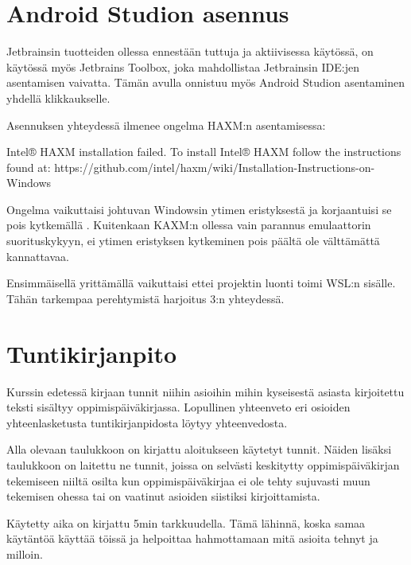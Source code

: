 \section{Android Studion asennus}

Jetbrainsin tuotteiden ollessa ennestään tuttuja ja aktiivisessa käytössä, on
käytössä myös Jetbrains Toolbox, joka mahdollistaa Jetbrainsin IDE:jen
asentamisen vaivatta. Tämän avulla onnistuu myös Android Studion asentaminen
yhdellä klikkaukselle.

Asennuksen yhteydessä ilmenee ongelma HAXM:n asentamisessa:

\begin{displayquote}
Intel® HAXM installation failed. To install Intel® HAXM follow the instructions found at: https://github.com/intel/haxm/wiki/Installation-Instructions-on-Windows
\end{displayquote}

Ongelma vaikuttaisi johtuvan Windowsin ytimen eristyksestä ja korjaantuisi se
pois kytkemällä \parencite{GithubIntelHaxmIssue412}. Kuitenkaan KAXM:n ollessa
vain parannus emulaattorin suorituskykyyn, ei ytimen eristyksen kytkeminen pois
päältä ole välttämättä kannattavaa.

Ensimmäisellä yrittämällä vaikuttaisi ettei projektin luonti toimi WSL:n
sisälle. Tähän tarkempaa perehtymistä harjoitus 3:n yhteydessä.

\section{Tuntikirjanpito}

Kurssin edetessä kirjaan tunnit niihin asioihin mihin kyseisestä asiasta
kirjoitettu teksti sisältyy oppimispäiväkirjassa. Lopullinen yhteenveto eri
osioiden yhteenlasketusta tuntikirjanpidosta löytyy yhteenvedosta.

Alla olevaan taulukkoon on kirjattu aloitukseen käytetyt tunnit. Näiden lisäksi
taulukkoon on laitettu ne tunnit, joissa on selvästi keskitytty
oppimispäiväkirjan tekemiseen niiltä osilta kun oppimispäiväkirjaa ei ole tehty
sujuvasti muun tekemisen ohessa tai on vaatinut asioiden siistiksi
kirjoittamista.

Käytetty aika on kirjattu 5min tarkkuudella. Tämä lähinnä, koska samaa käytäntöä
käyttää töissä ja helpoittaa hahmottamaan mitä asioita tehnyt ja milloin.

